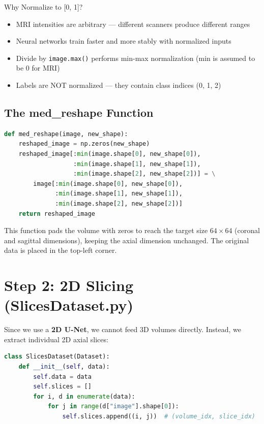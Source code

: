 \documentclass[12pt,a4paper]{report}
\begin{document}
\begin{conceptbox}{Why Normalize to [0, 1]?}
\begin{itemize}
    \item MRI intensities are arbitrary --- different scanners produce different ranges
    \item Neural networks train faster and more stably with normalized inputs
    \item Divide by \texttt{image.max()} performs min-max normalization (min is assumed to be 0 for MRI)
    \item Labels are NOT normalized --- they contain class indices (0, 1, 2)
\end{itemize}
\end{conceptbox}

\subsection{The med\_reshape Function}

\begin{lstlisting}[language=Python, caption=Zero-padding reshape function]
def med_reshape(image, new_shape):
    reshaped_image = np.zeros(new_shape)
    reshaped_image[:min(image.shape[0], new_shape[0]),
                   :min(image.shape[1], new_shape[1]),
                   :min(image.shape[2], new_shape[2])] = \
        image[:min(image.shape[0], new_shape[0]),
              :min(image.shape[1], new_shape[1]),
              :min(image.shape[2], new_shape[2])]
    return reshaped_image
\end{lstlisting}

This function pads the volume with zeros to reach the target size $64 \times 64$ (coronal and sagittal dimensions), keeping the axial dimension unchanged. The original data is placed in the top-left corner.

\section{Step 2: 2D Slicing (SlicesDataset.py)}

Since we use a \textbf{2D U-Net}, we cannot feed 3D volumes directly. Instead, we extract individual 2D axial slices:

\begin{lstlisting}[language=Python, caption=Creating indexable slice dataset]
class SlicesDataset(Dataset):
    def __init__(self, data):
        self.data = data
        self.slices = []
        for i, d in enumerate(data):
            for j in range(d["image"].shape[0]):
                self.slices.append((i, j))  # (volume_idx, slice_idx)
\end{lstlisting}
\end{document}
